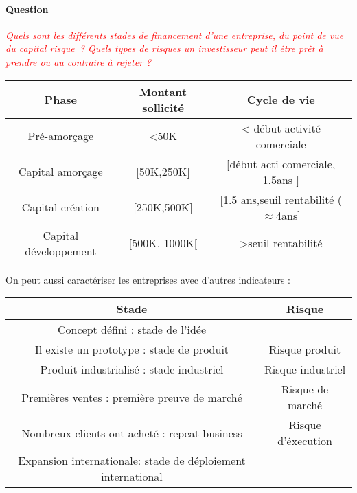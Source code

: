 \documentclass[12pt,oneside,a4paper]{article}
\newcommand{\question}[1]
{
\addtocounter{section}{1}
\paragraph*{Question \thesection}
\emph{\textcolor{red}{#1}}
}
\begin{document}
\question{Quels sont les différents stades de financement d’une entreprise, du point de vue du capital risque ? Quels types de risques un investisseur peut il être prêt à prendre ou au contraire à rejeter ?}


\vspace{1cm}
\begin{tabular}{|c|c|c|} 
	\hline
	 Phase & Montant sollicité & Cycle de vie\\
	 \hline
	 Pré-amorçage & <50K & < début activité comerciale\\
	 \hline
	 Capital amorçage & [50K,250K] & [début acti comerciale, 1.5ans ]\\
	 \hline
	 Capital création & [250K,500K] & [1.5 ans,seuil rentabilité ($\approx$4ans]\\
	 \hline
	 Capital développement & [500K, 1000K[ & >seuil rentabilité\\
	 \hline
\end{tabular} 
\vspace{1cm}


On peut aussi caractériser les entreprises avec d'autres indicateurs : 

\vspace{1cm}
\begin{center}
\begin{tabular}{|c|c|}
	\hline
	Stade & Risque\\
	\hline
	Concept défini : stade de l'idée & \\
	\hline
	Il existe un prototype : stade de produit & Risque produit\\
	\hline
	Produit industrialisé : stade industriel & Risque industriel\\
	\hline
	Premières ventes : première preuve de marché & Risque de marché\\
	\hline
	Nombreux clients ont acheté : repeat business & Risque d'éxecution\\
	\hline
	Expansion internationale: stade de déploiement international & \\
	\hline

\end{tabular}
\end{center}
\vspace{1cm}
\end{document}
